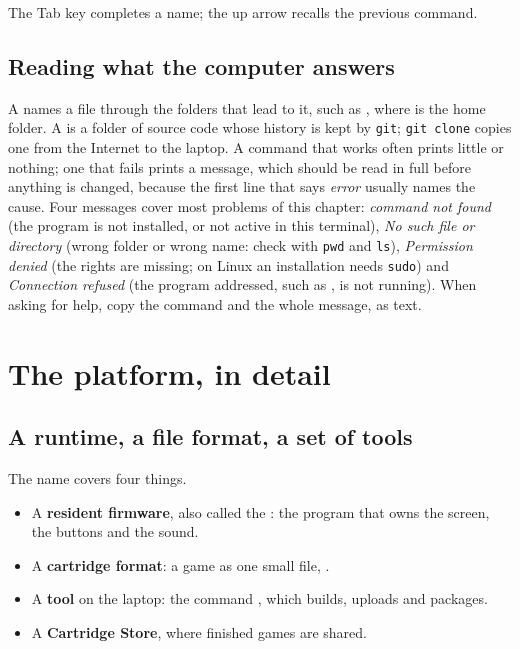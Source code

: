 \noindent The Tab key completes a name; the up arrow recalls the previous
command.

\subsection{Reading what the computer answers}

A  names a file through the folders that lead to it, such as
\allowbreak{}, where \fname{\textasciitilde} is
the home folder. A  is a folder of source code whose history is
kept by \texttt{git}; \texttt{git clone} copies one from the Internet to the
laptop. A command that works often prints little or nothing; one that fails
prints a message, which should be read in full before anything is changed,
because the first line that says \emph{error} usually names the cause. Four
messages cover most problems of this chapter: \emph{command not found} (the
program is not installed, or not active in this terminal), \emph{No such file or
directory} (wrong folder or wrong name: check with \texttt{pwd} and
\texttt{ls}), \emph{Permission denied} (the rights are missing; on Linux an
installation needs \texttt{sudo}) and \emph{Connection refused} (the program
addressed, such as \prgqt, is not running). When asking for help, copy the
command and the whole message, as text.

\section{The platform, in detail}

\subsection{A runtime, a file format, a set of tools}

The name \prg covers four things.

\begin{itemize}
\item A \textbf{resident firmware}, also called the : the program
  that owns the screen, the buttons and the sound.
\item A \textbf{cartridge format}: a game as one small file, .
\item A \textbf{tool} on the laptop: the command , which
  builds, uploads and packages.
\item A \textbf{Cartridge Store}, where finished games are shared.
\end{itemize}

